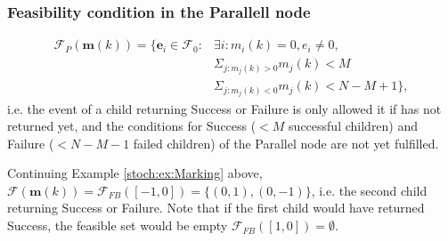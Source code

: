 \subsubsection*{Feasibility condition in the Parallell node}
\begin{equation}
\begin{split}
\mathcal{F}_{P}(\mathbf{m}(k))=\{\mathbf{e}_i\in  \mathcal{F}_0: 
& \exists i: m_i(k)=0, e_i \neq 0, \\
& \Sigma_{j:m_j(k)>0}m_j(k)<M \\
&  \Sigma_{j:m_j(k)<0}m_j(k)<N-M+1 \},
\end{split}
\end{equation}
i.e. the event of a child returning Success or Failure is only allowed it if has not returned yet, and the conditions for Success ($<M$ successful children) and Failure ($<N-M-1$ failed children) of the Parallel node are not yet fulfilled.

\begin{example}
Continuing Example \ref{stoch:ex:Marking} above, $\mathcal{F}(\mathbf{m}(k))=\mathcal{F}_{FB}([-1,0])=\{(0,1), (0, -1)\}$, i.e. the second child returning Success or Failure.
Note that if the first child would have returned Success, the feasible set would be empty $\mathcal{F}_{FB}([1,0])=\emptyset$.
\end{example}

